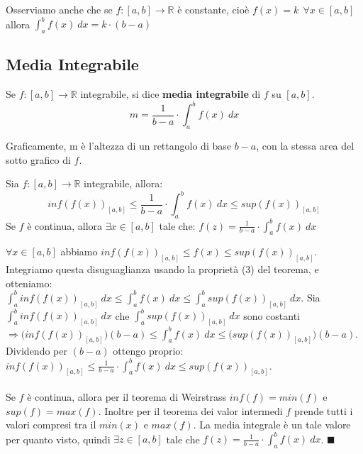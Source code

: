 \begin{observation}
Osserviamo anche che se $f: [a,b] \to \mathbb{R}$ è constante, cioè $f(x) = k \:\: \forall x \in [a,b]$ allora $\int_a^b f(x) \:dx = k \cdot (b-a)$
\end{observation}

\subsection{Media Integrabile}
\begin{definition}
Se $f: [a,b] \to \mathbb{R}$ integrabile, si dice \textbf{media integrabile} di $f$ su $[a,b]$.
\vspace{-10pt}
\[m = \frac{1}{b-a} \cdot \int_a^b f(x) \:dx\]
\end{definition}
Graficamente, m è l'altezza di un rettangolo di base $b-a$, con la stessa area del sotto grafico di $f$.

\begin{theorem}
Sia $f:[a,b] \to \mathbb{R}$ integrabile, allora:
\vspace{-5pt}
\[inf(f(x))_{[a,b]} \leq \frac{1}{b-a} \cdot \int_a^b f(x) \:dx \leq sup(f(x))_{[a,b]}\]
Se $f$ è continua, allora $\exists x \in [a,b]$ tale che:
$f(z) = \frac{1}{b-a} \cdot \int_a^b f(x) \:dx$
\end{theorem}

\begin{demostration}
$\forall x \in [a,b]$ abbiamo $inf(f(x))_{[a,b]} \leq f(x) \leq sup(f(x))_{[a,b]}$. Integriamo questa disuguaglianza usando la proprietà (3) del teorema, e otteniamo:\\
$\int_a^b inf(f(x))_{[a,b]}\:dx \leq \int_a^b f(x)\:dx \leq \int_a^b sup(f(x))_{[a,b]}\:dx$. Sia $\int_a^b inf(f(x))_{[a,b]}\:dx$ che $\int_a^b sup(f(x))_{[a,b]}\:dx$ sono costanti $\Longrightarrow \big( inf(f(x))_{[a,b]} \big)(b-a) \leq \int_a^b f(x)\:dx \leq \big( sup(f(x))_{[a,b]} \big)(b-a)$.\\
Dividendo per $(b-a)$ ottengo proprio: $inf(f(x))_{[a,b]} \leq \frac{1}{b-a} \cdot \int_a^b f(x) \:dx \leq sup(f(x))_{[a,b]}$.\\\\
Se $f$ è continua, allora per il teorema di Weirstrass $inf(f) = min(f)$ e $sup(f) = max(f)$. Inoltre per il teorema dei valor intermedi $f$ prende tutti i valori compresi tra il $min(x)$ e $max(f)$. La media integrale è un tale valore per quanto visto, quindi $\exists z \in [a,b]$ tale che $f(z) = \frac{1}{b-a} \cdot \int_a^b f(x)\:dx$. $\blacksquare$
\end{demostration}

